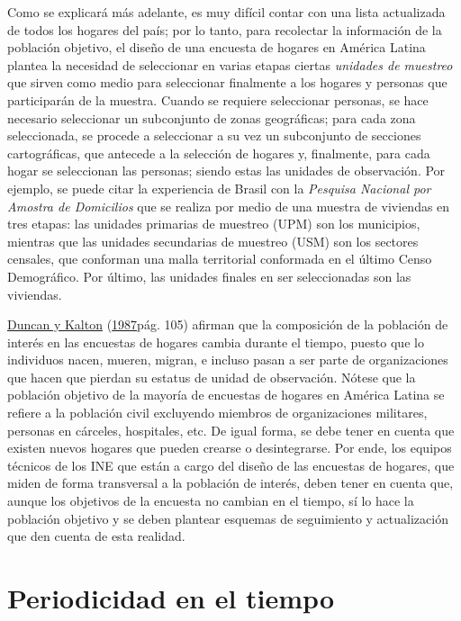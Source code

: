 \documentclass[
  12pt,
  spanish,
]{book}
\begin{document}
Como se explicará más adelante, es muy difícil contar con una lista actualizada de todos los hogares del país; por lo tanto, para recolectar la información de la población objetivo, el diseño de una encuesta de hogares en América Latina plantea la necesidad de seleccionar en varias etapas ciertas \emph{unidades de muestreo} que sirven como medio para seleccionar finalmente a los hogares y personas que participarán de la muestra. Cuando se requiere seleccionar personas, se hace necesario seleccionar un subconjunto de zonas geográficas; para cada zona seleccionada, se procede a seleccionar a su vez un subconjunto de secciones cartográficas, que antecede a la selección de hogares y, finalmente, para cada hogar se seleccionan las personas; siendo estas las unidades de observación. Por ejemplo, se puede citar la experiencia de Brasil con la \emph{Pesquisa Nacional por Amostra de Domicilios} que se realiza por medio de una muestra de viviendas en tres etapas: las unidades primarias de muestreo (UPM) son los municipios, mientras que las unidades secundarias de muestreo (USM) son los sectores censales, que conforman una malla territorial conformada en el último Censo Demográfico. Por último, las unidades finales en ser seleccionadas son las viviendas.

\protect\hyperlink{ref-Duncan_Kalton_1987}{Duncan y Kalton} (\protect\hyperlink{ref-Duncan_Kalton_1987}{1987}pág. 105) afirman que la composición de la población de interés en las encuestas de hogares cambia durante el tiempo, puesto que lo individuos nacen, mueren, migran, e incluso pasan a ser parte de organizaciones que hacen que pierdan su estatus de unidad de observación. Nótese que la población objetivo de la mayoría de encuestas de hogares en América Latina se refiere a la población civil excluyendo miembros de organizaciones militares, personas en cárceles, hospitales, etc. De igual forma, se debe tener en cuenta que existen nuevos hogares que pueden crearse o desintegrarse. Por ende, los equipos técnicos de los INE que están a cargo del diseño de las encuestas de hogares, que miden de forma transversal a la población de interés, deben tener en cuenta que, aunque los objetivos de la encuesta no cambian en el tiempo, sí lo hace la población objetivo y se deben plantear esquemas de seguimiento y actualización que den cuenta de esta realidad.

\hypertarget{periodicidad-en-el-tiempo}{%
\section{Periodicidad en el tiempo}\label{periodicidad-en-el-tiempo}}
\end{document}
